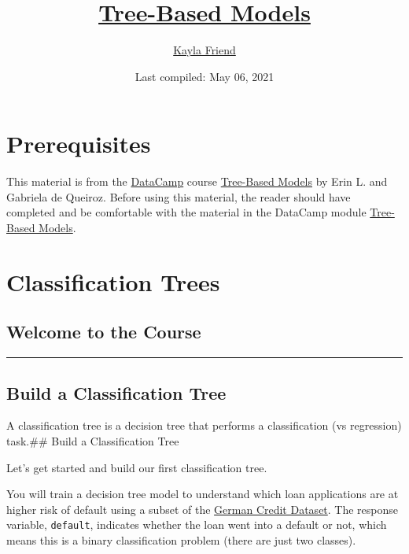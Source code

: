 \documentclass[
]{book}
\title{\href{https://learn.datacamp.com/courses/tree-based-models-in-r}{Tree-Based Models}}
\author{\href{https://kaylafriend.github.io/}{Kayla Friend}}
\date{Last compiled: May 06, 2021}
\begin{document}
\maketitle

{
\setcounter{tocdepth}{1}
\tableofcontents
}
\hypertarget{prerequisites}{%
\chapter{Prerequisites}\label{prerequisites}}

This material is from the \href{https://www.datacamp.com}{DataCamp} course \href{https://learn.datacamp.com/courses/tree-based-models-in-r}{Tree-Based Models} by Erin L. and Gabriela de Queiroz. Before using this material, the reader should have completed and be comfortable with the material in the DataCamp module \href{https://learn.datacamp.com/courses/tree-based-models-in-r}{Tree-Based Models}.

\hypertarget{classification-trees}{%
\chapter{Classification Trees}\label{classification-trees}}

\hypertarget{welcome-to-the-course}{%
\section*{Welcome to the Course}\label{welcome-to-the-course}}

\begin{center}\rule{0.5\linewidth}{0.5pt}\end{center}

\hypertarget{build-a-classification-tree}{%
\section{Build a Classification Tree}\label{build-a-classification-tree}}

A classification tree is a decision tree that performs a classification (vs regression) task.\#\# Build a Classification Tree

Let's get started and build our first classification tree.

You will train a decision tree model to understand which loan applications are at higher risk of default using a subset of the \href{https://archive.ics.uci.edu/ml/datasets/Statlog+\%28German+Credit+Data\%29}{German Credit Dataset}. The response variable, \texttt{default}, indicates whether the loan went into a default or not, which means this is a binary classification problem (there are just two classes).
\end{document}
